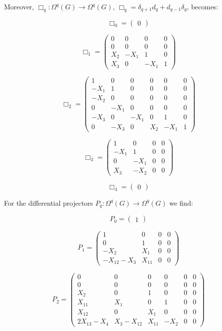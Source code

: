 \documentclass[reqno,12pt]{amsart}
\theoremstyle{plain}
\theoremstyle{definition}
\begin{document}
Moreover, $\Box_q\colon\Omega^q(G)\to\Omega^q(G)$, $\Box_q=\delta_{q+1}d_q+d_{q-1}\delta_q$, becomes:

$$
\Box_0=\left(\begin{array}{c}
0
\end{array}\right)
$$

$$
\Box_1=\left(\begin{array}{cc|c|c}
0&0&0&0\\
0&0&0&0\\\hline
X_2&-X_1&1&0\\\hline
X_3&0&-X_1&1
\end{array}\right)
$$

$$
\Box_2=\left(\begin{array}{c|cc|cc|c}
1&0&0&0&0&0\\\hline
-X_1&1&0&0&0&0\\
-X_2&0&0&0&0&0\\\hline
0&-X_1&0&0&0&0\\
-X_3&0&-X_1&0&1&0\\\hline
0&-X_3&0&X_2&-X_1&1
\end{array}\right)
$$

$$
\Box_3=\left(\begin{array}{c|c|cc}
1&0&0&0\\\hline
-X_1&1&0&0\\\hline
0&-X_1&0&0\\
X_3&-X_2&0&0
\end{array}\right)
$$

$$
\Box_4=\left(\begin{array}{c}
0
\end{array}\right)
$$

For the differential projectors $P_q\colon\Omega^q(G)\to\Omega^q(G)$ we find:

$$
P_0=\left(\begin{array}{c}
1
\end{array}\right)
$$

$$
P_1=\left(\begin{array}{cc|c|c}
1&0&0&0\\
0&1&0&0\\\hline
-X_2&X_1&0&0\\\hline
-X_{12}-X_3&X_{11}&0&0
\end{array}\right)
$$

$$
P_2=\left(\begin{array}{c|cc|cc|c}
0&0&0&0&0&0\\\hline
0&0&0&0&0&0\\
X_2&0&1&0&0&0\\\hline
X_{11}&X_1&0&1&0&0\\
X_{12}&0&X_1&0&0&0\\\hline
2X_{13}-X_4&X_3-X_{12}&X_{11}&-X_2&0&0
\end{array}\right)
$$
\end{document}
